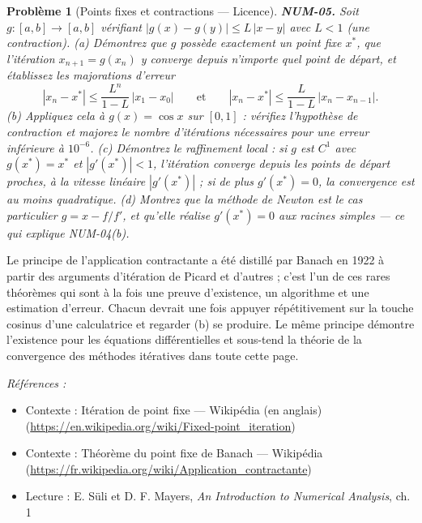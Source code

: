 \documentclass[11pt]{article}
\newtheorem{problem}{Problème}
\newenvironment{refs}{\par\small\noindent\emph{Références :}\begin{itemize}\setlength\itemsep{0pt}}{\end{itemize}\normalsize}
\begin{document}
\bigskip

\begin{problem}[{Points fixes et contractions --- Licence}]
\textbf{NUM-05.} Soit $g : [a,b] \to [a,b]$ vérifiant
$|g(x) - g(y)| \le L\,|x - y|$ avec $L < 1$ (une \textit{contraction}).
(a) Démontrez que $g$ possède exactement un point fixe $x^*$, que l'itération
$x_{n+1} = g(x_n)$ y converge depuis n'importe quel point de départ, et établissez
les majorations d'erreur
\[ |x_n - x^*| \le \frac{L^n}{1-L}\,|x_1 - x_0|
\qquad\text{et}\qquad
|x_n - x^*| \le \frac{L}{1-L}\,|x_n - x_{n-1}|. \]
(b) Appliquez cela à $g(x) = \cos x$ sur $[0,1]$ : vérifiez l'hypothèse de
contraction et majorez le nombre d'itérations nécessaires pour une erreur inférieure
à $10^{-6}$.
(c) Démontrez le raffinement local : si $g$ est $C^1$ avec $g(x^*) = x^*$ et
$|g'(x^*)| < 1$, l'itération converge depuis les points de départ proches, à la
vitesse linéaire $|g'(x^*)|$ ; si de plus $g'(x^*) = 0$, la convergence est au
moins quadratique.
(d) Montrez que la méthode de Newton est le cas particulier $g = x - f/f'$, et
qu'elle réalise $g'(x^*) = 0$ aux racines simples --- ce qui explique NUM-04(b).
\end{problem}

\noindent Le principe de l'application contractante a été distillé par Banach
en 1922 à partir des arguments d'itération de Picard et d'autres ; c'est l'un de ces
rares théorèmes qui sont à la fois une preuve d'existence, un algorithme et une
estimation d'erreur. Chacun devrait une fois appuyer répétitivement sur la touche
cosinus d'une calculatrice et regarder (b) se produire. Le même principe démontre
l'existence pour les équations différentielles et sous-tend la théorie de la
convergence des méthodes itératives dans toute cette page.

\begin{refs}
\item Contexte : Itération de point fixe --- Wikipédia (en anglais) (\url{https://en.wikipedia.org/wiki/Fixed-point_iteration})
\item Contexte : Théorème du point fixe de Banach --- Wikipédia (\url{https://fr.wikipedia.org/wiki/Application_contractante})
\item Lecture : E. Süli et D. F. Mayers, \textit{An Introduction to Numerical Analysis}, ch. 1
\end{refs}

\bigskip
\end{document}
